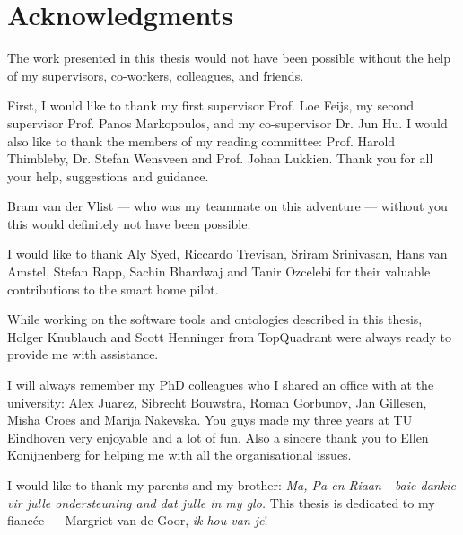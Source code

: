 \cleardoublepage




\bigskip

\begingroup
\let\clearpage\relax
\let\cleardoublepage\relax
\let\cleardoublepage\relax
\chapter*{Acknowledgments}
The work presented in this thesis would not have been possible without the help of my supervisors, co-workers, colleagues, and friends.

First, I would like to thank my first supervisor Prof. Loe Feijs, my second supervisor Prof. Panos Markopoulos, and my co-supervisor Dr. Jun Hu. I would also like to thank the members of my reading committee: Prof. Harold Thimbleby, Dr. Stefan Wensveen and Prof. Johan Lukkien. Thank you for all your help, suggestions and guidance.

Bram van der Vlist --- who was my teammate on this adventure --- without you this would definitely not have been possible.

I would like to thank Aly Syed, Riccardo Trevisan, Sriram Srinivasan, Hans van Amstel, Stefan Rapp, Sachin Bhardwaj and Tanir Ozcelebi for their valuable contributions to the smart home pilot.

While working on the software tools and ontologies described in this thesis, Holger Knublauch and Scott Henninger from TopQuadrant were always ready to provide me with assistance.

I will always remember my PhD colleagues who I shared an office with at the university: Alex Juarez, Sibrecht Bouwstra, Roman Gorbunov, Jan Gillesen, Misha Croes and Marija Nakevska. You guys made my three years at TU Eindhoven very enjoyable and a lot of fun. Also a sincere thank you to Ellen Konijnenberg for helping me with all the organisational issues. 

I would like to thank my parents and my brother: \emph{Ma, Pa en Riaan - baie dankie vir julle ondersteuning and dat julle in my glo.} This thesis is dedicated to my fianc\'ee --- Margriet van de Goor, \emph{ik hou van je}!

\endgroup



